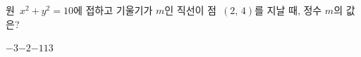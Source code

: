 원~$x^2+y^2=10$에 접하고 기울기가 $m$인 직선이 점~$(2,\,4)$를 지날 때, 정수 $m$의 값은?
\begin{choices32}{$-3$}{$-2$}{$-1$}{$1$}{$3$}\end{choices32}
